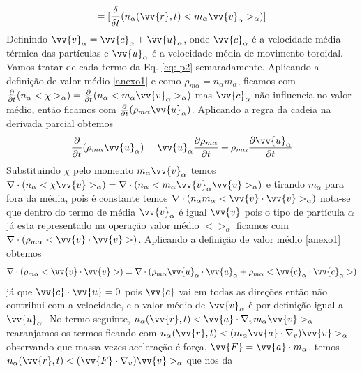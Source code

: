 \documentclass[12pt,oneside,a4paper]{abntex2}
\begin{document}
\begin{equation*}
=[\frac{\delta}{\delta t}(n_\alpha(\vv{r},t)<m_\alpha \vv{v}_\alpha>_\alpha)]
\end{equation*}
Definindo $\vv{v}_\alpha = \vv{c}_\alpha + \vv{u}_\alpha$, onde $\vv{c}_\alpha$ é a velocidade média térmica das partículas e  $\vv{u}_\alpha$ é a velocidade média de movimento toroidal. Vamos tratar de cada termo da Eq. \ref{eq: p2} semaradamente.
Aplicando a definição de valor médio \ref{anexo1} e como $ \rho_{m\alpha} = n_\alpha m_\alpha$, ficamos com $\frac{\partial }{\partial t} (n_\alpha <\chi>_\alpha)=\frac{\partial }{\partial t} (n_\alpha <m_\alpha \vv{v}_\alpha>_\alpha)$ mas $\vv{c}_\alpha$ não influencia no valor médio, então ficamos com $\frac{\partial }{\partial t} (\rho_{m\alpha} \vv{u}_\alpha)$. Aplicando a regra da cadeia na derivada parcial obtemos
\begin{equation}
\label{eq: pit14}
\frac{\partial }{\partial t} (\rho_{m\alpha} \vv{u}_\alpha) = \vv{u}_\alpha \frac{\partial \rho_{m\alpha}}{\partial t}+\rho_{m\alpha} \frac{\partial \vv{u}_\alpha}{\partial t}
\end{equation} 
Substituindo $\chi$ pelo momento $m_\alpha \vv{v}_\alpha$ temos $\nabla \cdot (n_\alpha <\chi \vv{v}>_\alpha) =  \nabla \cdot (n_\alpha <m_\alpha \vv{v}_\alpha \vv{v}>_\alpha)$ e tirando $m_\alpha$ para fora da média, pois é constante temos $\nabla \cdot (n_\alpha m_\alpha < \vv{v} \cdot \vv{v}>_\alpha)$ nota-se que dentro do termo de média $ \vv{v}_\alpha$ é igual $\vv{v}$ pois o tipo de partícula $\alpha$ já esta representado na operação valor médio $< >_\alpha$ ficamos com $\nabla \cdot (\rho_{m\alpha} <\vv{v} \cdot \vv{v}>)$.  Aplicando a definição de valor médio \ref{anexo1} obtemos 
\begin{equation}
\label{eq: pit15}
\nabla \cdot (\rho_{m\alpha} <\vv{v} \cdot \vv{v}>) = \nabla \cdot ( \rho_{m\alpha}\vv{u}_\alpha \cdot \vv{u}_\alpha + \rho_{m\alpha}<\vv{c}_\alpha \cdot \vv{c}_\alpha>)
\end{equation} 
já que $\vv{c} \cdot \vv{u} = 0$ pois $\vv{c}$ vai em todas as direções então não contribui com a velocidade, e o valor médio de $\vv{v}_\alpha$ é por definição igual a $\vv{u}_\alpha$.
No termo seguinte, $n_\alpha(\vv{r},t)<\vv{a} \cdot \nabla_v m_\alpha \vv{v}>_\alpha$ rearanjamos os termos ficando com $n_\alpha(\vv{r},t)<(m_\alpha \vv{a} \cdot \nabla_v) \vv{v}>_\alpha$ observando que massa vezes aceleração é força, $\vv{F} = \vv{a} \cdot m_\alpha $, temos $n_\alpha(\vv{r},t) <(\vv{F} \cdot \nabla_v)\vv{v}>_\alpha$ que nos da
\end{document}
